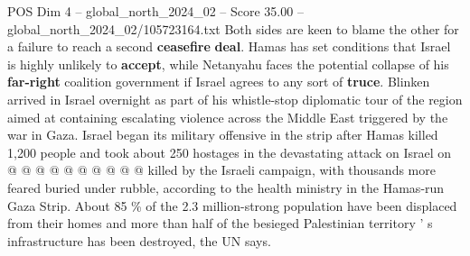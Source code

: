 \begin{textsample}{POS Dim 4 – global\_north\_2024\_02 – Score 35.00 – global\_north\_2024\_02/105723164.txt}
Both sides are keen to blame the other for a failure to reach a second \textbf{ceasefire} \textbf{deal}.
Hamas has set conditions that Israel is highly unlikely to \textbf{accept}, while Netanyahu faces the potential collapse of his \textbf{far-right} coalition government if Israel agrees to any sort of \textbf{truce}.
Blinken arrived in Israel overnight as part of his whistle-stop diplomatic tour of the region aimed at containing escalating violence across the Middle East triggered by the war in Gaza.
Israel began its military offensive in the strip after Hamas killed 1,200 people and took about 250 hostages in the devastating attack on Israel on @ @ @ @ @ @ @ @ @ @ killed by the Israeli campaign, with thousands more feared buried under rubble, according to the health ministry in the Hamas-run Gaza Strip.
About 85 \% of the 2.3 million-strong population have been displaced from their homes and more than half of the besieged Palestinian territory ' s infrastructure has been destroyed, the UN says.

\end{textsample}
